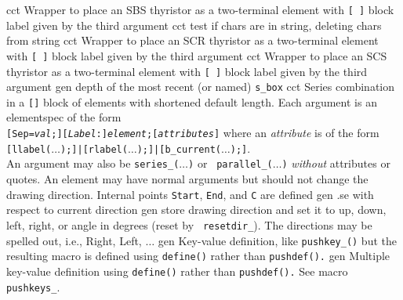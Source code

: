%
  {cct}%
  {Wrapper to place an SBS thyristor as a two-terminal element with
   {\tt [ ]} block label given by the third argument
    }%
%
  {cct}%
  {test if chars are in string, deleting chars from string}%
%
  {cct}%
  {Wrapper to place an SCR thyristor as a two-terminal element with
   {\tt [ ]} block label given by the third argument
    }%
%
  {cct}%
  {Wrapper to place an SCS thyristor as a two-terminal element with
   {\tt [ ]} block label given by the third argument
    }%
%
  {gen}%
  {depth of the most recent (or named) {\tt s\_box}
    }%
%
  {cct}%
  { Series combination in a {\tt []} block of elements
    with shortened default length.
    Each argument is an elementspec of the form\\
    {\tt[Sep={\sl val};][{\sl Label}:]{\sl element};[{\sl attributes}]} where
    an {\sl attribute} is of the form\\
    {\tt[llabel($\ldots$);]|[rlabel($\ldots$);]|[b\_current($\ldots$);]}.\\
    An argument may also be {\tt series\_($\ldots$)} or {\tt
    parallel\_($\ldots$)} {\em without} attributes or quotes.
    An element may have normal arguments but should not
    change the drawing direction.
    Internal points {\tt Start}, {\tt End}, and {\tt C} are defined
    }%
%
  {gen}%
  {.se with respect to current direction}%
%
  {gen}%
  {store drawing direction and set it to
    up, down, left, right, or angle in degrees (reset by {\tt
    resetdir\_}).  The directions may be spelled out, i.e., Right,
    Left, $\ldots$
   }%
%
  {gen}%
  {Key-value definition, like {\tt pushkey\_()} but the resulting
  macro is defined using {\tt define()} rather than {\tt pushdef().}
   }%
%
  {gen}%
  {Multiple key-value definition using {\tt define()} rather than
   {\tt pushdef().} See macro {\tt pushkeys\_}.
   }%
